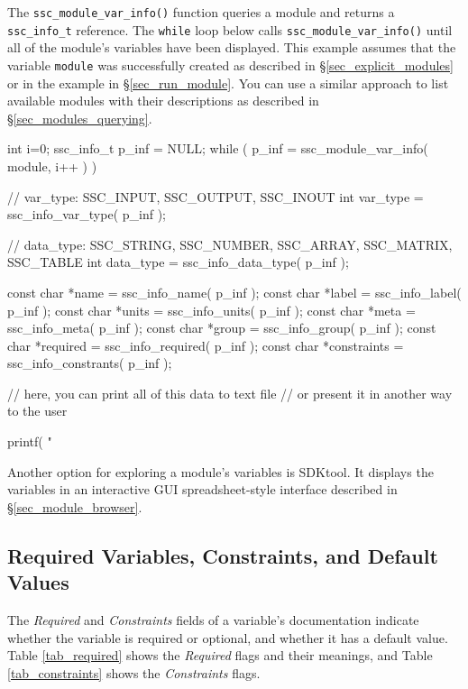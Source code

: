 \documentclass{scrartcl} %
\begin{document}
The \texttt{ssc\_module\_var\_info()} function queries a module and returns a \texttt{ssc\_info\_t} reference. The \texttt{while} loop below calls \texttt{ssc\_module\_var\_info()} until all of the module's variables have been displayed. This example assumes that the variable \texttt{module} was successfully created as described in \S\ref{sec_explicit_modules} or in the example in \S\ref{sec_run_module}. You can use a similar approach to list available modules with their descriptions as described in \S\ref{sec_modules_querying}.

\begin{verbatimtab}[4]
int i=0;
ssc_info_t p_inf = NULL;
while ( p_inf = ssc_module_var_info( module, i++ ) )
{
	// var_type: SSC_INPUT, SSC_OUTPUT, SSC_INOUT
	int var_type = ssc_info_var_type( p_inf );

	// data_type: SSC_STRING, SSC_NUMBER, SSC_ARRAY, SSC_MATRIX, SSC_TABLE   
	int data_type = ssc_info_data_type( p_inf );
      
	const char *name = ssc_info_name( p_inf );
	const char *label = ssc_info_label( p_inf );
	const char *units = ssc_info_units( p_inf );
	const char *meta = ssc_info_meta( p_inf );
	const char *group = ssc_info_group( p_inf );
	const char *required = ssc_info_required( p_inf );
	const char *constraints = ssc_info_constrants( p_inf );

	// here, you can print all of this data to text file
	// or present it in another way to the user

	printf( "%
}

\end{verbatimtab}

Another option for exploring a module's variables is SDKtool. It displays the variables in an interactive GUI spreadsheet-style interface described in \S\ref{sec_module_browser}.

\subsection{Required Variables, Constraints, and Default Values}
\label{sec_def_const}

The \emph{Required} and \emph{Constraints} fields of a variable's documentation indicate whether the variable is required or optional, and whether it has a default value. Table \ref{tab_required} shows the \emph{Required} flags and their meanings, and Table \ref{tab_constraints} shows the \emph{Constraints} flags. 
\end{document}
